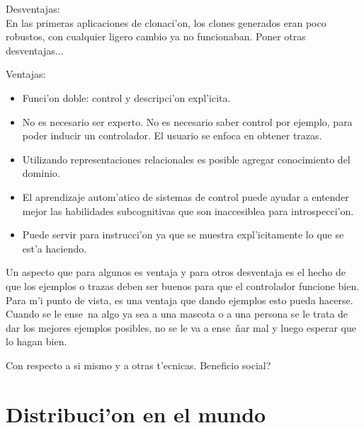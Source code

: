 \documentclass[11pt]{article}
\begin{document}
Desventajas:\\
En las primeras aplicaciones de clonaci'on, los clones generados eran poco robustos, con cualquier ligero cambio ya no funcionaban. Poner otras desventajas...

Ventajas:
\begin{itemize}
\item Funci'on doble: control y descripci'on expl'icita.
\item No es necesario ser experto. No es necesario saber control por ejemplo, para poder inducir un controlador. El usuario se enfoca en obtener trazas.
\item Utilizando representaciones relacionales es posible agregar conocimiento del dominio.
\item El aprendizaje autom'atico de sistemas de control puede ayudar a entender mejor las habilidades subcognitivas que son inaccesiblea para introspecci'on.
\item Puede servir para instrucci'on ya que se muestra expl'icitamente lo que se est'a haciendo.
\end{itemize}

Un aspecto que para algunos es ventaja y para otros desventaja es el hecho de que los ejemplos o trazas deben ser buenos para que el controlador funcione bien. Para m'i punto de vista, es una ventaja que dando ejemplos esto pueda hacerse. Cuando se le ense~na algo ya sea a una mascota o a una persona se le trata de dar los mejores ejemplos posibles, no se le va a ense~ñar mal y luego esperar que lo hagan bien. 

Con respecto a si mismo y a otras t'ecnicas. Beneficio social?
\section{Distribuci'on en el mundo}



\end{document}
